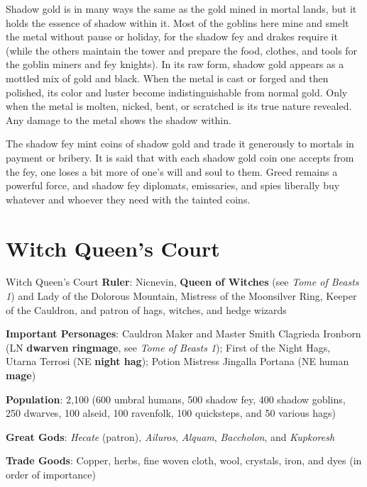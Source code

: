 \documentclass[10pt,a4paper,twoside,bg=print,twocolumn,openany,nodeprecatedcode]{dndbook}
\begin{document}
Shadow gold is in many ways the same as the gold mined in mortal lands, but it holds the essence of shadow within it. Most of the goblins here mine and smelt the metal without pause or holiday, for the shadow fey and drakes require it (while the others maintain the tower and prepare the food, clothes, and tools for the goblin miners and fey knights). In its raw form, shadow gold appears as a mottled mix of gold and black. When the metal is cast or forged and then polished, its color and luster become indistinguishable from normal gold. Only when the metal is molten, nicked, bent, or scratched is its true nature revealed. Any damage to the metal shows the shadow within.

The shadow fey mint coins of shadow gold and trade it generously to mortals in payment or bribery. It is said that with each shadow gold coin one accepts from the fey, one loses a bit more of one's will and soul to them. Greed remains a powerful force, and shadow fey diplomats, emissaries, and spies liberally buy whatever and whoever they need with the tainted coins.

\section{Witch Queen's Court}
\begin{DndSidebar}[float=!b]{Witch Queen's Court}
\textbf{Ruler}: Nicnevin, \textbf{Queen of Witches} (see \textit{Tome of Beasts 1}) and Lady of the Dolorous Mountain, Mistress of the Moonsilver Ring, Keeper of the Cauldron, and patron of hags, witches, and hedge wizards



\textbf{Important Personages}: Cauldron Maker and Master Smith Clagrieda Ironborn (LN \textbf{dwarven ringmage}, see \textit{Tome of Beasts 1}); First of the Night Hags, Utarna Terrosi (NE \textbf{night hag}); Potion Mistress Jingalla Portana (NE human \textbf{mage})



\textbf{Population}: 2,100 (600 umbral humans, 500 shadow fey, 400 shadow goblins, 250 dwarves, 100 alseid, 100 ravenfolk, 100 quicksteps, and 50 various hags)



\textbf{Great Gods}: \textit{Hecate} (patron), \textit{Ailuros}, \textit{Alquam}, \textit{Baccholon}, and \textit{Kupkoresh}



\textbf{Trade Goods}: Copper, herbs, fine woven cloth, wool, crystals, iron, and dyes (in order of importance)





\end{DndSidebar}
\end{document}
